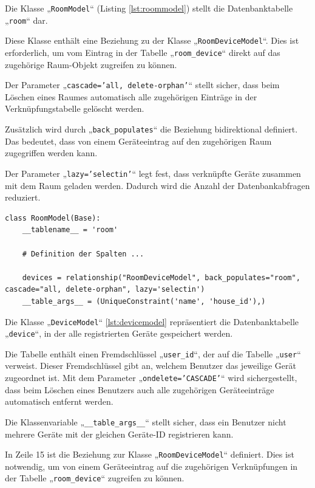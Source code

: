 \documentclass[12pt, letterpaper]{article}
\begin{document}
  \par Die Klasse „\texttt{RoomModel}“ (Listing \ref{lst:roommodel}) stellt die Datenbanktabelle „\texttt{room}“ dar. 
  \par Diese Klasse enthält eine Beziehung zu der Klasse „\texttt{RoomDeviceModel}“. Dies ist erforderlich, um vom Eintrag in der Tabelle „\texttt{room\_device}“ direkt auf das zugehörige Raum-Objekt zugreifen zu können. 
  \par Der Parameter „\texttt{cascade='all, delete-orphan'}“ stellt sicher, dass beim Löschen eines Raumes automatisch alle zugehörigen Einträge in der Verknüpfungstabelle gelöscht werden.
  \par Zusätzlich wird durch „\texttt{back\_populates}“ die Beziehung bidirektional definiert. Das bedeutet, dass von einem Geräteeintrag auf den zugehörigen Raum zugegriffen werden kann.
  \par Der Parameter „\texttt{lazy='selectin'}“ legt fest, dass verknüpfte Geräte zusammen mit dem Raum geladen werden. Dadurch wird die Anzahl der Datenbankabfragen reduziert. 
  \begin{lstlisting}[style=mypython, label={lst:roommodel}, caption={models.py: RoomModel}]
  class RoomModel(Base):
    __tablename__ = 'room'

    # Definition der Spalten ...    

    devices = relationship("RoomDeviceModel", back_populates="room", cascade="all, delete-orphan", lazy='selectin')
    __table_args__ = (UniqueConstraint('name', 'house_id'),)

  \end{lstlisting}
  \par Die Klasse „\texttt{DeviceModel}“ \ref{lst:devicemodel} repräsentiert die Datenbanktabelle „\texttt{device}“, in der alle registrierten Geräte gespeichert werden.
  \par Die Tabelle enthält einen Fremdschlüssel „\texttt{user\_id}“, der auf die Tabelle „\texttt{user}“ verweist. Dieser Fremdschlüssel gibt an, welchem Benutzer das jeweilige Gerät zugeordnet ist. Mit dem Parameter „\texttt{ondelete='CASCADE'}“ wird sichergestellt, dass beim Löschen eines Benutzers auch alle zugehörigen Geräteeinträge automatisch entfernt werden. 
  \par Die Klassenvariable „\texttt{\_\_table\_args\_\_}“ stellt sicher, dass ein Benutzer nicht mehrere Geräte mit der gleichen Geräte-ID registrieren kann. 
  \par In Zeile 15 ist die Beziehung zur Klasse „\texttt{RoomDeviceModel}“ definiert. Dies ist notwendig, um von einem Geräteeintrag auf die zugehörigen Verknüpfungen in der Tabelle „\texttt{room\_device}“ zugreifen zu können. 
\end{document}
